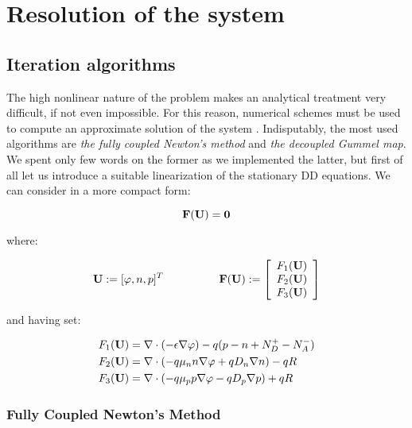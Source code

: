 \chapter{Resolution of the system}

\section{Iteration algorithms}

The high nonlinear nature of the problem 	makes an analytical treatment very difficult, if not even impossible. For this reason, numerical schemes must be used to compute an approximate solution of the system . Indisputably, the most used algorithms are \textit{the fully coupled Newton's method} and \textit{the decoupled Gummel map}. We spent only few words on the former as we implemented the latter, but first of all let us introduce a suitable linearization of the stationary DD equations. We can consider  in a more compact form:

\begin{equation}
\label{eq: abstract problem fully}
\mathbf{F(U)}=\mathbf{0}
\end{equation}

where:

\begin{equation}
\vect{U}:=[\varphi,n,p]^T \psp{30} \vect{F(U)}:=\left[ \begin{array}{c}
F_1(\vect{U}) \\
F_2(\vect{U}) \\
F_3(\vect{U})
\end{array}
\right]
\end{equation}

and having set:

\begin{align*}
F_1(\mathbf{U}) & = \nabla \cdot (-\epsilon \nabla \varphi) - q(p-n+N_D^+-N_A^-) \\
F_2(\mathbf{U}) & = \nabla \cdot ( - q\mu_n n \nabla \varphi + qD_n \nabla n )-qR \\
F_3(\mathbf{U}) & = \nabla \cdot (- q\mu_p p \nabla \varphi - qD_p \nabla p )+qR
\end{align*}

\vspace{0.1cm}

\subsection{Fully Coupled Newton's Method}


